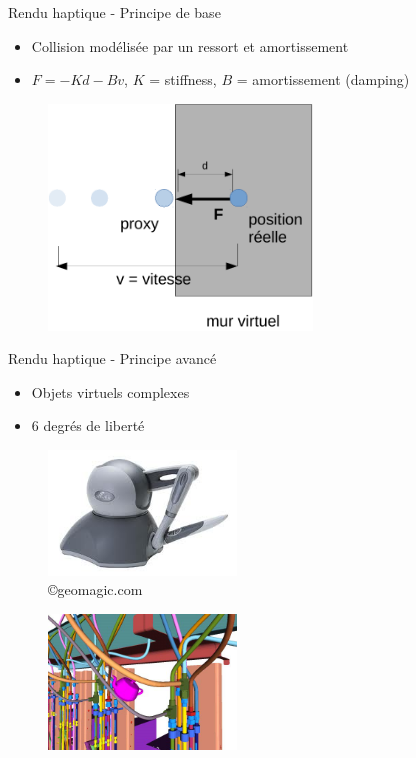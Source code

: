 \begin{frame}{Rendu haptique - Principe de base}
\begin{itemize}
\item Collision modélisée par un ressort et amortissement
\item $F = -Kd - Bv$, $K$ = stiffness, $B$ = amortissement (damping)
\end{itemize}
\begin{figure}
\centering
\includegraphics[width=7cm]{images/hapticRendering3}{}
\end{figure}
\end{frame}

\begin{frame}{Rendu haptique - Principe avancé}
\begin{itemize}
\item Objets virtuels complexes
\item 6 degrés de liberté
\end{itemize}
\begin{multicols}{2}
\begin{figure}
\centering
\includegraphics[width=5cm]{images/phantom}
\vspace{0.25cm}
\caption{\copyright geomagic.com}
\end{figure}
\begin{figure}
\centering
\includegraphics[width=5cm]{images/hapticRenderingExample}
\caption{\cite{McNeely2005}}
\end{figure}
\end{multicols}
\end{frame}

